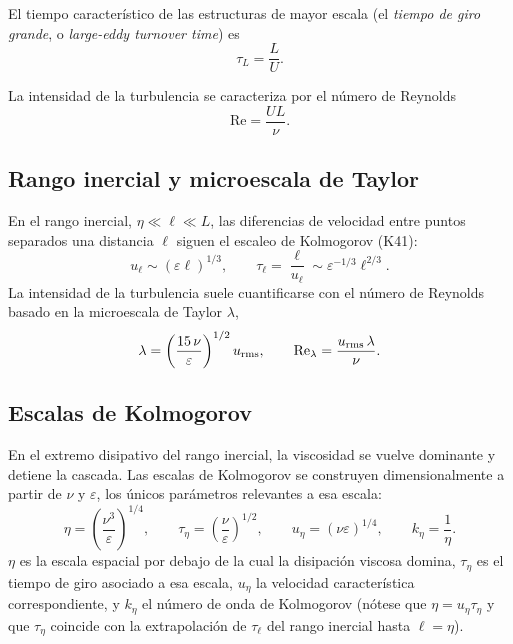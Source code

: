 \documentclass[11pt]{article}
\begin{document}
El tiempo característico de las estructuras de mayor escala (el
\emph{tiempo de giro grande}, o \emph{large-eddy turnover time}) es
\begin{equation}
  \tau_L = \frac{L}{U}.
\end{equation}

La intensidad de la turbulencia se caracteriza por el número de Reynolds
\begin{equation}
  \mathrm{Re} = \frac{U L}{\nu}.
\end{equation}

\subsection{Rango inercial y microescala de Taylor}

En el rango inercial, $\eta \ll \ell \ll L$, las diferencias de velocidad
entre puntos separados una distancia $\ell$ siguen el escaleo de
Kolmogorov (K41):
\begin{equation}
  u_\ell \sim (\varepsilon \ell)^{1/3},
  \qquad
  \tau_\ell = \frac{\ell}{u_\ell} \sim \varepsilon^{-1/3}\ell^{2/3}.
\end{equation}
La intensidad de la turbulencia suele cuantificarse con el número de
Reynolds basado en la microescala de Taylor $\lambda$,
\begin{equation}
  \lambda = \left(\frac{15\,\nu}{\varepsilon}\right)^{1/2} u_{\rm rms},
  \qquad
  \mathrm{Re}_\lambda = \frac{u_{\rm rms}\,\lambda}{\nu}.
\end{equation}

\subsection{Escalas de Kolmogorov}

En el extremo disipativo del rango inercial, la viscosidad se vuelve
dominante y detiene la cascada. Las escalas de Kolmogorov se construyen
dimensionalmente a partir de $\nu$ y $\varepsilon$, los únicos parámetros
relevantes a esa escala:
\begin{equation}
  \eta = \left(\frac{\nu^3}{\varepsilon}\right)^{1/4}, \qquad
  \tau_\eta = \left(\frac{\nu}{\varepsilon}\right)^{1/2}, \qquad
  u_\eta = (\nu\varepsilon)^{1/4}, \qquad
  k_\eta = \frac{1}{\eta}.
\end{equation}
$\eta$ es la escala espacial por debajo de la cual la disipación viscosa
domina, $\tau_\eta$ es el tiempo de giro asociado a esa escala, $u_\eta$
la velocidad característica correspondiente, y $k_\eta$ el número de onda
de Kolmogorov (nótese que $\eta = u_\eta \tau_\eta$ y que $\tau_\eta$
coincide con la extrapolación de $\tau_\ell$ del rango inercial hasta
$\ell=\eta$).
\end{document}

